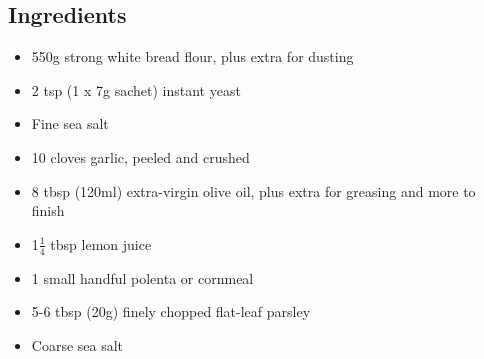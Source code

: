 \documentclass{book}
\begin{document}
\subsection*{Ingredients}
\begin{itemize}
\item 550g strong white bread flour, plus extra for dusting
\item 2 tsp (1 x 7g sachet) instant yeast
\item Fine sea salt
\item 10 cloves garlic, peeled and crushed
\item 8 tbsp (120ml) extra-virgin olive oil, plus extra for greasing and more to finish
\item 1$\frac{1}{4}$ tbsp lemon juice
\item 1 small handful polenta or cornmeal
\item 5-6 tbsp (20g) finely chopped flat-leaf parsley
\item Coarse sea salt
\end{itemize}
\end{document}
